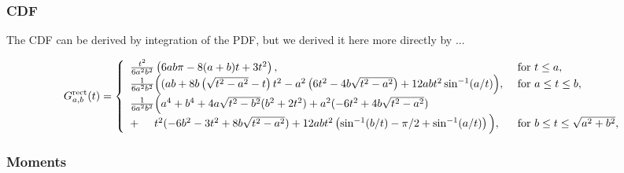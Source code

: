 \subsubsection{CDF}

The CDF can be derived by integration of the PDF, but we derived it
here more directly by 
...

\begin{equation}
  G^{\rm rect}_{a,b}(t)  = \left\{
    \begin{array}{ll}
     \frac{t^2}{6 a^2 b^2} \left( 
       6 a b \pi - 8(a+b) t + 3 t^2
             \right),  
         & \mbox{ for } t \leq a, \\
     \frac{1}{6 a^2 b^2} \Big( 
       (ab + 8 b \left( \sqrt{t^2 - a^2} -t \right) t^2
          - a^2 \left( 6 t^2 - 4 b  \sqrt{t^2 - a^2} \right)
          + 12 a b t^2 \sin^{-1}(a/t)
             \Big),  
         & \mbox{ for } a \leq t \leq b, \\
     \frac{1}{6 a^2 b^2} \Big( 
         a^4 + b^4
        + 4 a \sqrt{t^2 - b^2} (b^2 + 2 t^2)
        + a^2 (-6 t^2 + 4 b \sqrt{t^2 - a^2}) & \\
        + \hspace{5mm} t^2 (-6 b^2 - 3 t^2 + 8 b \sqrt{t^2 - a^2})
        + 12 a b t^2 \left( 
                       \sin^{-1}(b/t) - \pi/2 + \sin^{-1}(a/t)
                     \right)
      \Big),
         & \mbox{ for } b \leq t \leq \sqrt{a^2 + b^2}, \\
    \end{array} \right. 
  \label{eqn:rectangle_cdf}   
\end{equation}


\subsubsection{Moments}

